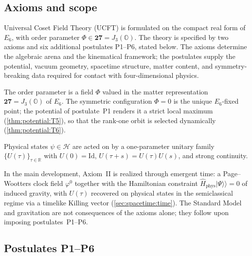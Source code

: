 \subsection{Axioms and scope}
\label{sec:intro:axioms}

Universal Coset Field Theory (UCFT) is formulated on the compact real form of
$E_6$, with order parameter $\Phi\in\mathbf{27}=J_3(\mathbb{O})$. The theory is
specified by two axioms and six additional postulates \textnormal{P1--P6}, stated
below. The axioms determine the algebraic arena and the kinematical framework;
the postulates supply the potential, vacuum geometry, spacetime structure,
matter content, and symmetry-breaking data required for contact with four-dimensional
physics.

\begin{axiom}\label{ax:intro:I}
The order parameter is a field $\Phi$ valued in the matter representation
$\mathbf{27}=J_3(\mathbb{O})$ of $E_6$. The symmetric configuration $\Phi=0$ is
the unique $E_6$-fixed point; the potential of postulate~\textnormal{P1} renders
it a strict local maximum (\autoref{thm:potential:T5}), so that the rank-one
orbit is selected dynamically (\autoref{thm:potential:T6}).
\end{axiom}

\begin{axiom}\label{ax:intro:II}
Physical states $\psi\in\mathcal{H}$ are acted on by a one-parameter unitary
family $\{U(\tau)\}_{\tau\in\mathbb{R}}$ with $U(0)=\mathrm{Id}$,
$U(\tau+s)=U(\tau)U(s)$, and strong continuity.
\end{axiom}

In the main development, Axiom~II is realized through emergent time: a
Page--Wootters clock field $\varphi^{0}$ together with the Hamiltonian constraint
$\hat{H}_{\mathrm{phys}}\lvert\Psi\rangle\!\rangle=0$ of induced gravity, with
$U(\tau)$ recovered on physical states in the semiclassical regime via a timelike
Killing vector (\autoref{sec:spacetime:time}). The Standard Model and
gravitation are not consequences of the axioms alone; they follow upon imposing
postulates~\textnormal{P1--P6}.

\subsection{Postulates \textnormal{P1--P6}}
\label{sec:intro:postulates}

